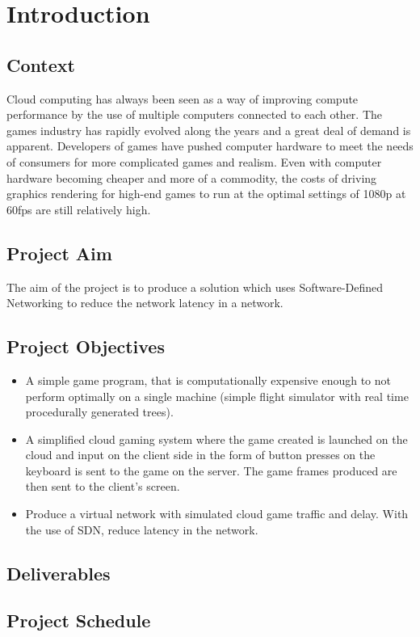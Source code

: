 \chapter{Introduction}
\label{chapter1}

\section{Context}
Cloud computing has always been seen as a way of improving compute performance by the
use of multiple computers connected to each other. The games industry has rapidly evolved
along the years and a great deal of demand is apparent. Developers of games have pushed
computer hardware to meet the needs of consumers for more complicated games and
realism. Even with computer hardware becoming cheaper and more of a commodity, the
costs of driving graphics rendering for high-end games to run at the optimal settings of
1080p at 60fps are still relatively high.

\section{Project Aim}
The aim of the project is to produce a solution which uses Software-Defined Networking to reduce the network latency in a network. \cite{parikh1980adaptive}

\section{Project Objectives}
\begin{itemize}
  \item A simple game program, that is computationally expensive enough to not perform optimally on a single machine (simple flight simulator with real time procedurally generated trees).
  \item A simplified cloud gaming system where the game created is launched on the
cloud and input on the client side in the form of button presses on the keyboard is sent to the game on the server. The game frames produced are then sent to the client's screen.
  \item Produce a virtual network with simulated cloud game traffic and delay. With the use of SDN, reduce latency in the network.
\end{itemize}

\section{Deliverables}
\lipsum[1-1]

\section{Project Schedule}
\lipsum[1-1]